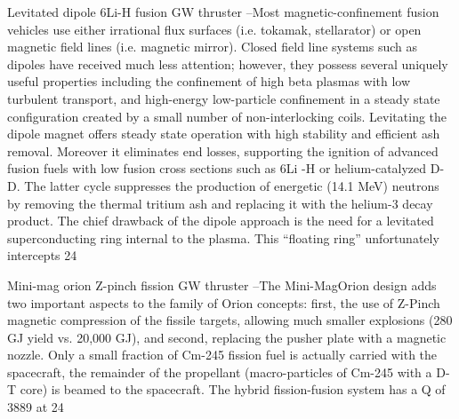 \documentclass[a4paper]{book}
\begin{document}
Levitated dipole 6Li-H fusion GW thruster –Most magnetic-confinement fusion vehicles use either irrational flux surfaces (i.e. tokamak, stellarator) or open magnetic field lines (i.e. magnetic mirror). Closed field line systems such as dipoles have received much less attention; however, they possess several uniquely useful properties including the confinement of high beta plasmas with low turbulent transport, and high-energy low-particle confinement in a steady state configuration created by a small number of non-interlocking coils. Levitating the dipole magnet offers steady state operation with high stability and efficient ash removal. Moreover it eliminates end losses, supporting the ignition of advanced fusion fuels with low fusion cross sections such as 6Li -H or helium-catalyzed D-D. The latter cycle suppresses the production of energetic (14.1 MeV) neutrons by removing the thermal tritium ash and replacing it with the helium-3 decay product. The chief drawback of the dipole approach is the need for a levitated superconducting ring internal to the plasma. This “floating ring” unfortunately intercepts 24%
 
Mini-mag orion Z-pinch fission GW thruster –The Mini-MagOrion design adds two important aspects to the family of Orion concepts: first, the use of Z-Pinch magnetic compression of the fissile targets, allowing much smaller explosions (280 GJ yield vs. 20,000 GJ), and second, replacing the pusher plate with a magnetic nozzle. Only a small fraction of Cm-245 fission fuel is actually carried with the spacecraft, the remainder of the propellant (macro-particles of Cm-245 with a D-T core) is beamed to the spacecraft. The hybrid fission-fusion system has a Q of 3889 at 24%
 
\end{document}

